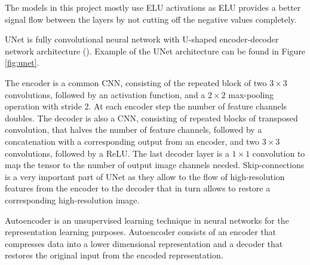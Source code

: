 The models in this project mostly use ELU activations as ELU provides a better signal flow between the layers by not cutting off the negative values completely.

\begin{definition}[UNet]
	UNet is fully convolutional neural network with U-shaped encoder-decoder network architecture (\cite{Ronneberger_2015}). Example of the UNet architecture can be found in Figure \ref{fig:unet}.
\end{definition}

The encoder is a common CNN, consisting of the repeated
block of two $3 \times 3$ convolutions, followed by
an activation function, and a $2 \times 2$ max-pooling operation with stride 2. At each encoder step  the number of feature channels doubles. The decoder is also a CNN, consisting of repeated blocks of transposed convolution, that halves the number of feature channels, followed by a concatenation with a corresponding output from an encoder, and two $3 \times 3$ convolutions, followed by a ReLU. The last decoder layer is a $1 \times 1$ convolution to map the tensor to the number of output image channels needed. Skip-connections is a very important part of UNet as they allow to the flow of high-resolution features from the encoder to the decoder that in turn allows to restore a corresponding high-resolution image.

\begin{definition}[Autoencoder]
	Autoencoder is an unsupervised learning technique in neural networks for the representation learning purposes. Autoencoder consists of an encoder that compresses data into a lower dimensional representation and a decoder that restores the original input from the encoded representation.
\end{definition}